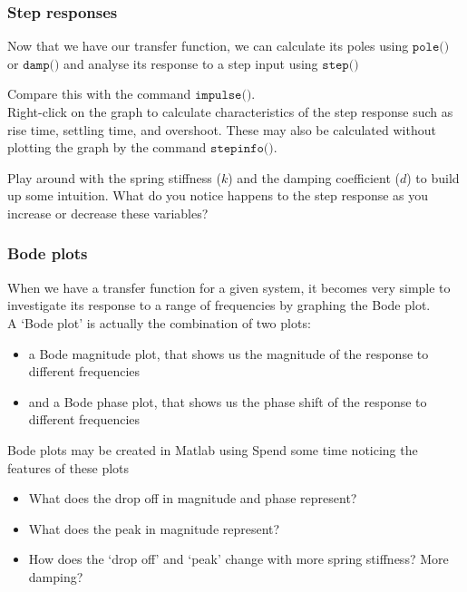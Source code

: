 \documentclass[9pt]{beamer-control}
\begin{document}
\begin{frame}
	\frametitle{Step responses}
	Now that we have our transfer function, we can calculate its poles using $\texttt{pole()}$ or $\texttt{damp()}$ and analyse its response to a step input using $\texttt{step()}$
	
	Compare this with the command $\texttt{impulse()}$.\\
	
	Right-click on the graph to calculate characteristics of the step response such as rise time, settling time, and overshoot. These may also be calculated without plotting the graph by the command
	$\texttt{stepinfo()}$.
	
	Play around with the spring stiffness ($k$) and the damping coefficient ($d$) to build up some intuition. What do you notice happens to the step response as you increase or decrease these variables?
\end{frame}


\begin{frame}[fragile]
	\frametitle{Bode plots}
	When we have a transfer function for a given system, it becomes very simple to investigate its response to a range of frequencies by graphing the Bode plot.\\
	A `Bode plot' is actually the combination of two plots:
	\begin{itemize}
		\item a Bode magnitude plot, that shows us the magnitude of the response to different frequencies
		\item and a Bode phase plot, that shows us the phase shift of the response to different frequencies
	\end{itemize} 
	Bode plots may be created in Matlab using 
	Spend some time noticing the features of these plots
	\begin{itemize}
		\item What does the drop off in magnitude and phase represent?
		\item What does the peak in magnitude represent?
		\item How does the `drop off' and `peak' change with more spring stiffness? More damping?
	\end{itemize}
	
\end{frame}


\end{document}
